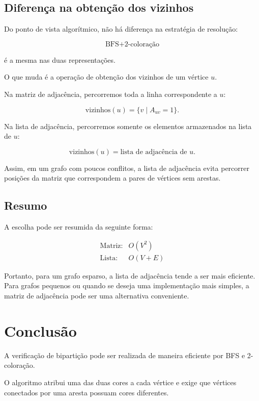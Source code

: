 \documentclass[12pt,a4paper]{article}
\begin{document}
\subsection{Diferença na obtenção dos vizinhos}

Do ponto de vista algorítmico, não há diferença na estratégia de
resolução:

\[
\boxed{\text{BFS}+\text{2-coloração}}
\]

é a mesma nas duas representações.

O que muda é a operação de obtenção dos vizinhos de um vértice $u$.

Na matriz de adjacência, percorremos toda a linha correspondente a
$u$:

\[
\text{vizinhos}(u)
=
\{v\mid A_{uv}=1\}.
\]

Na lista de adjacência, percorremos somente os elementos armazenados
na lista de $u$:

\[
\text{vizinhos}(u)
=
\text{lista de adjacência de }u.
\]

Assim, em um grafo com poucos conflitos, a lista de adjacência evita
percorrer posições da matriz que correspondem a pares de vértices sem
arestas.

\subsection{Resumo}

A escolha pode ser resumida da seguinte forma:

\[
\boxed{
\begin{array}{ll}
\text{Matriz:} & O(V^2)\\[2mm]
\text{Lista:} & O(V+E)
\end{array}
}
\]

Portanto, para um grafo esparso, a lista de adjacência tende a ser
mais eficiente. Para grafos pequenos ou quando se deseja uma
implementação mais simples, a matriz de adjacência pode ser uma
alternativa conveniente.

\section{Conclusão}

A verificação de bipartição pode ser realizada de maneira eficiente
por BFS e 2-coloração.

O algoritmo atribui uma das duas cores a cada vértice e exige que
vértices conectados por uma aresta possuam cores diferentes.
\end{document}
